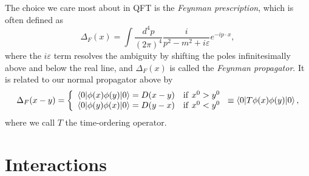 The choice we care most about in QFT is the \textit{Feynman prescription}, which is often defined as
\begin{equation}
    \label{eq:01_qft_quantization_feynman_propagator_fourier}
    \Delta_F(x) = \int \frac{d^4p}{(2\pi)^4} \frac{i}{p^2 - m^2 + i\varepsilon} e^{-ip\cdot x},
\end{equation}
where the $i\varepsilon$ term resolves the ambiguity by shifting the poles infinitesimally above and below the real line, and $\Delta_F(x)$ is called the \textit{Feynman propagator}.
It is related to our normal propagator above by
\begin{equation}
    \label{eq:01_qft_quantization_propagator_feynman}
        \Delta_F(x - y) = \left\{
            \begin{array}{ll}
                \braket{0|\phi(x)\phi(y)|0} = D(x - y) & \mathrm{if\ } x^0 > y^0 \\
                \braket{0|\phi(y)\phi(x)|0} = D(y - x) & \mathrm{if\ } x^0 < y^0
            \end{array}
          \right. \equiv \braket{0|T\phi(x)\phi(y)|0},
\end{equation}
where we call $T$ the time-ordering operator.







\section{Interactions}
\label{sec:01_qft_interactions}

